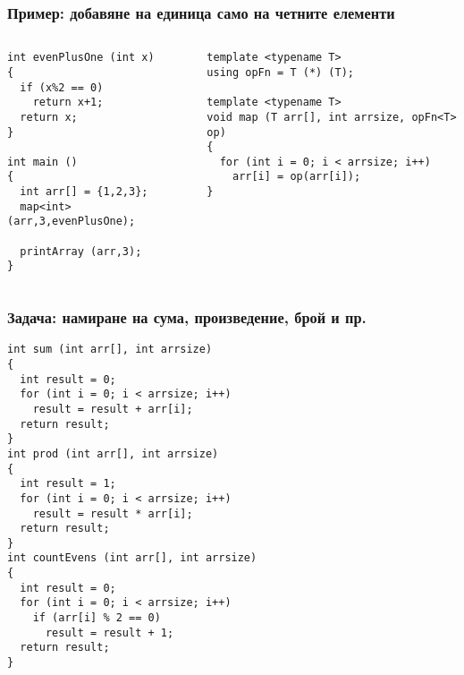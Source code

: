 \documentclass{beamer}
\begin{document}
\begin{frame}[fragile]
\frametitle{Пример: добавяне на единица само на четните елементи}


\begin{columns}[t]
  \begin{column}{0.5\textwidth}

\begin{flushleft}
\begin{lstlisting}
int evenPlusOne (int x)
{
  if (x%2 == 0)
    return x+1;
  return x;  
}

int main ()
{
  int arr[] = {1,2,3};
  map<int> (arr,3,evenPlusOne);

  printArray (arr,3);
}

\end{lstlisting}  
\end{flushleft}
  \end{column}
  \begin{column}{0.5\textwidth}
\begin{flushleft}
\begin{lstlisting}
template <typename T>
using opFn = T (*) (T);

template <typename T>
void map (T arr[], int arrsize, opFn<T> op)
{
  for (int i = 0; i < arrsize; i++)
    arr[i] = op(arr[i]);
}
\end{lstlisting}  
\end{flushleft}

  \end{column}
\end{columns}


\end{frame}



\begin{frame}[fragile]
\frametitle{Задача: намиране на сума, произведение, брой и пр.}

\begin{flushleft}
\begin{lstlisting}
int sum (int arr[], int arrsize)
{
  int result = 0;
  for (int i = 0; i < arrsize; i++)
    result = result + arr[i];
  return result;
}
int prod (int arr[], int arrsize)
{
  int result = 1;
  for (int i = 0; i < arrsize; i++)
    result = result * arr[i];
  return result;
}
int countEvens (int arr[], int arrsize)
{
  int result = 0;
  for (int i = 0; i < arrsize; i++)
    if (arr[i] % 2 == 0)
      result = result + 1;
  return result;
}
\end{lstlisting}  
\end{flushleft}

  
\end{frame}
\end{document}
